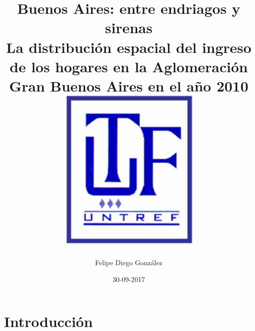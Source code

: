 \documentclass{report}
\title{
	{Buenos Aires: entre endriagos y sirenas}\\
	{\large La distribución espacial del ingreso de los hogares en la Aglomeración Gran Buenos Aires en el año 2010}\\
	{\includegraphics{untrefLogo.jpg}}
}
\author{Felipe Diego González}
\date{30-09-2017}
\begin{document}
  	\maketitle
  	
  	\tableofcontents
  	
  	\chapter{Introducción}
  	

	  	
	
  		
  	 
  		
  	  	  
  	
  
\end{document}
